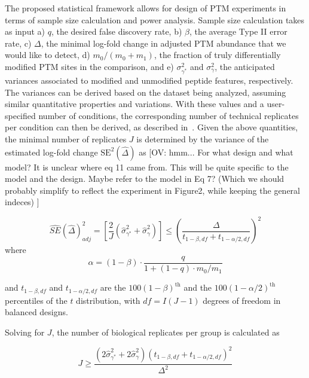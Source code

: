\documentclass[mcp]{article}
\numberwithin{table}{section}
\def\todo#1{{\color{red}[#1]}}
\begin{document}
The proposed statistical framework allows for design of PTM experiments in terms of sample size calculation and power analysis. 
Sample size calculation takes as input a) $q$, the desired false discovery rate, b) $\beta$, the average Type II error rate, c) $\Delta$, the minimal log-fold change in adjusted PTM abundance that we would like to detect, d) $m_0 / (m_0 + m_1)$, the fraction of truly differentially modified PTM sites in the comparison, and e) $\sigma_{\gamma^{\ast}}^{2}$ and $\sigma_{\gamma}^{2}$, the anticipated variances associated to modified and unmodified peptide features, respectively. The variances can be derived based on the dataset being analyzed, assuming similar quantitative properties and variations. With these values and a user-specified number of conditions, the corresponding number of technical replicates per condition can then be derived, as described in~\cite{kutner_etal_04a}. Given the above quantities, the minimal number of replicates $J$ is determined by the variance of the estimated log-fold change $\mathrm{SE}^{2}(\hat{\Delta})$ as \todo{OV: hmm... For what design and what model? It is unclear where eq 11 came from. This will be quite specific to the model and the design. Maybe refer to the model in Eq 7? (Which we should probably simplify to reflect the experiment in Figure2, while keeping the general indeces) }

\begin{equation}
\widehat{SE}(\hat{\Delta})_{adj}^2 = \left[ \frac{2}{J} \left( \hat{\sigma}_{\gamma^{\ast}}^{2} + \hat{\sigma}_{\gamma}^{2} \right) \right]
\leq \left( \frac{\Delta}{t_{1-\beta, df} + t_{1-\alpha /2, df}} \right)^{2}
\end{equation}
where 
\begin{equation}
\alpha = (1 - \beta) \cdot \frac{q}{1 + (1-q) \cdot m_0 / m_1}
\end{equation}

and $t_{1-\beta, df}$ and $t_{1-\alpha /2, df}$ are the $100(1-\beta)^{\text{th}}$ and the $100(1-\alpha /2)^{\text{th}}$ percentiles of the $t$ distribution, with $df = I(J-1)$ degrees of freedom in balanced designs. 

Solving for $J$, the number of biological replicates per group is calculated as 

\begin{equation}
J \geq \frac{(2\hat{\sigma}_{\gamma^{\ast}}^{2} + 2\hat{\sigma}_{\gamma}^{2})(t_{1-\beta, df} + t_{1-\alpha /2, df})^2}{\Delta^2}
\end{equation}
\end{document}
